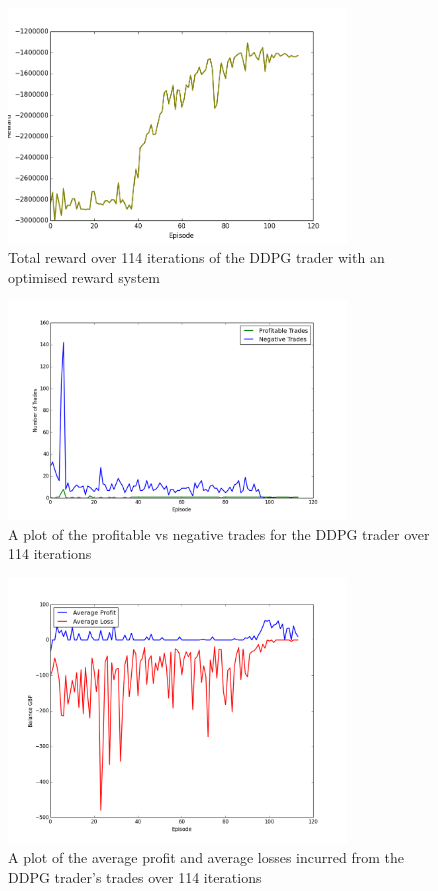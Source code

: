 \documentclass[ %
                    author={Ashwinder Khurana},
                supervisor={Prof Dave Cliff},
                    degree={MEng},
                     title={The Deeply Reinforced Trader},
                  subtitle={},
                      type={enterprise},
                      year={2020} ]{dissertation}
\begin{document}
{\begin{figure}[H] 
	\centering
  	\includegraphics[width=0.8\textwidth]{DDPG-Reward}
  	\caption{Total reward over 114 iterations of the DDPG trader with an optimised reward system }
	\label{fig:DDPG-Good-Vs-Bad}  
\end{figure}

\begin{figure}[H] 
	\centering
  	\includegraphics[width=0.8\textwidth]{DDPG-Good-vs-Bad}
  	\caption{A plot of the profitable vs negative trades for the DDPG trader over 114 iterations}
	\label{fig:DDPG-Good-Vs-Bad}  
\end{figure}

\begin{figure}[H] 
	\centering
  	\includegraphics[width=0.8\textwidth]{DDPG-Average-Trade}
  	\caption{A plot of the average profit and average losses incurred from the DDPG trader's trades over 114 iterations }
	\label{fig:DDPG-Average-Trade}  
\end{figure}


}
\end{document}
